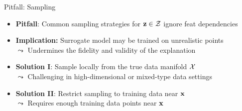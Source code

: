 \documentclass[10pt,compress,t,notes=noshow, xcolor=table]{beamer}
\begin{document}
\begin{frame}{Pitfall: Sampling}
	\begin{itemize}
	\itemsep1em
	  \item \textbf{Pitfall}: Common sampling strategies for $\mathbf{z} \in \mathcal{Z}$ ignore feat dependencies
        \item \textbf{Implication:} Surrogate model may be trained on unrealistic points\\
  $\leadsto$ Undermines the fidelity and validity of the explanation
      \pause
      \item \textbf{Solution I}: Sample locally from the true data manifold $\mathcal{X}$\\
  $\leadsto$ Challenging in high-dimensional or mixed-type data settings
      \item \textbf{Solution II}: Restrict sampling to training data near $\mathbf{x}$\\
      $\leadsto$ Requires enough training data points near $\mathbf{x}$
    \end{itemize}
    
\end{frame}
\end{document}

